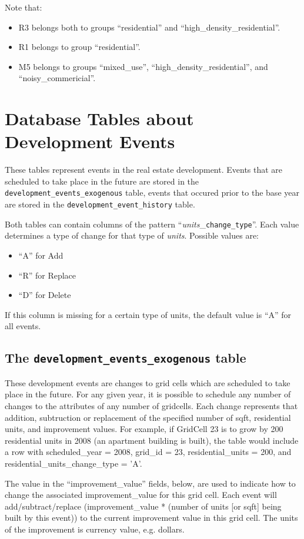 Note that:
\begin{itemize}
\tight
\item R3 belongs both to groups ``residential'' and
``high_density_residential''.
\item R1 belongs to group ``residential''.
\item M5 belongs to groups ``mixed_use'', ``high_density_residential'', and
``noisy_commericial''.
\end{itemize}


\section{Database Tables about Development Events}
\label{sec:db-tables-events}
These tables represent events in the real estate development. Events that are scheduled 
to take place in the future are stored in the {\tt development_events_exogenous} table,
events that occured prior to the base year are stored in the {\tt development_event_history} table.

Both tables can contain columns of the pattern ``{\it units}_{\tt change_type}''. Each value determines
a type of change for that type of {\it units}. Possible values are:
\begin{itemize} \tight
\item ``A'' for Add
\item ``R'' for Replace
\item ``D'' for Delete
\end{itemize}
If this column is missing for a certain type of units, the default value is ``A'' for all events.

\subsection{The {\tt development_events_exogenous} table}

These development events are changes to grid cells which are scheduled to take
place
in the future. For any given year, it is possible to schedule any number of
changes to the attributes of any number of gridcells. Each change represents
that addition, subtruction or replacement of the specified number of sqft, residential units, and
improvement values.  For example, if
GridCell 23 is to grow by 200 residential units in 2008 (an apartment building
is built), the table would include a row with scheduled_year = 2008, grid_id =
23, residential_units = 200, and residential_units_change_type = 'A'.

The value in the ``improvement_value'' fields, below, are used to indicate how
to change the associated improvement_value for this grid cell. Each event will
add/subtract/replace (improvement_value * (number
of units [or sqft] being built by this event)) to the current improvement value
in
this grid cell.  The units of the improvement is currency value, e.g. dollars.

